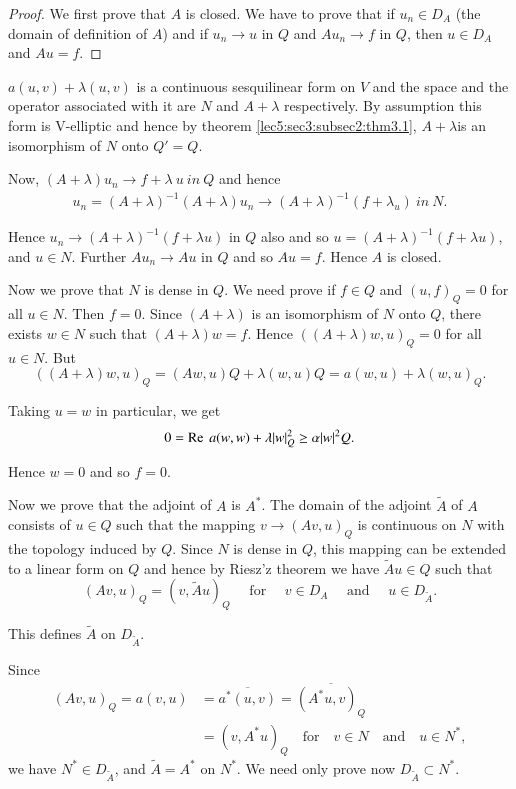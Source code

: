 \begin{proof}
  We first prove that $A$ is closed. We have to prove that if $u_n
  \in D_A$ (the domain of definition of $A$) and if $u_n
  \rightarrow u$ in $Q$ and $Au_n \rightarrow f$ in $Q$, then $u
  \in D_A$ and $Au = f$. 
\end{proof}

$a(u, v) + \lambda (u, v)$ is a continuous sesquilinear form on $V$
and the space and the operator associated with it are $N$ and $A +
\lambda$ respectively. By assumption this form is V-elliptic and hence
by theorem \ref{lec5:sec3:subsec2:thm3.1}, $A + \lambda$\pageoriginale is an isomorphism of $N$ onto $Q' =
Q$. 

Now, $(A + \lambda) u_n \rightarrow f + \lambda~ u~ in~ Q$ and hence
\begin{gather*}
u_n =  (A + \lambda)^{-1}  (A + \lambda) u_n \rightarrow  (A +
\lambda)^{-1} (f + \lambda_u)~ in~ N. 
\end{gather*}

Hence $u_n \rightarrow  (A + \lambda)^{-1}(f + \lambda u)$ in $Q$ also
and so $u =  (A + \lambda)^{-1} (f + \lambda u)$, and $u \in
N$. Further $Au_n \rightarrow Au$ in $Q$ and so $Au = f$. Hence $A$ is
closed. 

Now we prove that $N$ is dense in $Q$. We need prove if $f \in
Q$ and $(u, f)_Q = 0$ for all $u \in N$. Then $f = 0$. Since
$(A + \lambda)$ is an isomorphism of $N$ onto $Q$, there exists $w
\in N$ such that $(A + \lambda)w = f$. Hence $((A + \lambda)w,
u)_Q = 0$ for all $u \in N$. But  
$$
((A +\lambda)w, u)_Q = (Aw, u)Q + \lambda (w, u)Q = a(w, u) +\lambda (w, u)_Q.
$$

Taking $u = w$ in particular, we get
$$
0 = \operatorname{Re}  ~a (w, w) + \lambda |w|^2_Q \ge \alpha |w|^2 Q.
$$

Hence $w = 0$ and so $f = 0$.

Now we prove that the adjoint of $A$ is $A^*$. The domain of the
adjoint $\tilde{A}$  of $A$ consists of $ u \in Q$ such that
the mapping $v \rightarrow (Av, u)_Q$ is continuous on $N$ with the
topology induced by $Q$. Since $N$ is dense in $Q$, this mapping can
be extended to a linear form on $Q$ and hence by Riesz'z theorem we
have $\tilde{A} u \in Q$ such that 
$$
(Av, u)_Q = (v, \tilde{A}u)_Q \quad \text{ for } \quad v \in
D_A \quad \text{ and } \quad u \in D_{\tilde{A}}. 
$$

This defines $\tilde{A}$ on $D_{\tilde{A}}$.

Since
\begin{align*}
  (Av, u)_Q = a(v, u)& = \overline{a^*(u, v)} = \overline{(A^*u, v)_Q}\\ 
  & = (v, A^*u)_Q  \quad \text{for} \quad v \in N \quad
  \text{and} \quad u \in N^*,  \tag{1}\label{lec7:sec3:subsec5:eq1} 
\end{align*}
we have $N^* \in D_{\tilde{A}}$, and $\tilde{A} = A^*$ on
$N^*$. We need only prove now $D_{\tilde{A}} \subset N^*$. 

